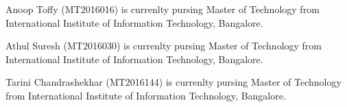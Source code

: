 \documentclass[journal]{IEEEtran}
\begin{document}
\begin{IEEEbiography}{Anoop Toffy}
(MT2016016) is currenlty pursing Master of Technology from International Institute of Information Technology, Bangalore. 
\end{IEEEbiography}


\begin{IEEEbiography}{Athul Suresh}
(MT2016030) is currenlty pursing Master of Technology from International Institute of Information Technology, Bangalore. 
\end{IEEEbiography}

\begin{IEEEbiography}{Tarini Chandrashekhar}
(MT2016144) is currenlty pursing Master of Technology from International Institute of Information Technology, Bangalore. 

\end{IEEEbiography}
\end{document}
